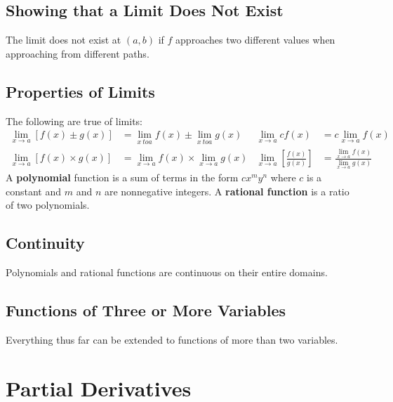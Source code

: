 \documentclass[../Calculus_\Roman{3}]{subfiles}
\begin{document}
		\subsection*{Showing that a Limit Does Not Exist}
				The limit does not exist at $(a, b)$ if $f$ approaches two different values when approaching from different paths.
		\subsection*{Properties of Limits}
			The following are true of limits:
				\begin{align*}
					\lim_{x \to a}[f(x) \pm g(x)] &= \lim_{x\ to a}f(x) \pm \lim_{x\ to a}g(x) &
						\lim_{x \to a} cf(x) &= c\lim_{x\to a}f(x) \\
					\lim_{x \to a}[f(x) \times g(x)] &= \lim_{x \to a} f(x) \times \lim_{x \to a} g(x) &
						\lim_{x \to a}\left[\frac{f(x)}{g(x)}\right] &= \frac{\lim_{x \to a}f(x)}{\lim_{x \to a}g(x)}
				\end{align*}
			A \textbf{polynomial} function is a sum of terms in the form $cx^my^n$ where $c$ is a constant and $m$ and $n$ are nonnegative integers. A \textbf{rational function} is a ratio of two polynomials.
		\subsection*{Continuity}
				Polynomials and rational functions are continuous on their entire domains.
		\subsection*{Functions of Three or More Variables}
				Everything thus far can be extended to functions of more than two variables.
	\section{Partial Derivatives}
\end{document}
